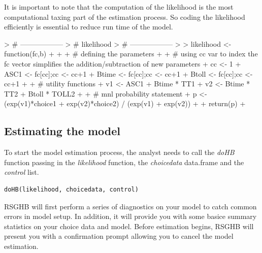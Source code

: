 \documentclass{article}
\begin{document}
It is important to note that the computation of the likelihood is the most computational taxing part of the estimation process. So coding the likelihood efficiently is essential to reduce run time of the model.


\begin{Schunk}
\begin{Sinput}
> # ------------------
> # likelihood
> # ------------------
> 
> likelihood <- function(fc,b)
+ {
+ 
+   # defining the parameters          
+ 
+   # using cc var to index the fc vector simplifies the addition/subtraction of new parameters     
+   cc <- 1
+   ASC1   <- fc[cc];cc <- cc+1
+   Btime  <- fc[cc];cc <- cc+1
+   Btoll  <- fc[cc];cc <- cc+1  
+ 
+   # utility functions
+   v1 <- ASC1       + Btime * TT1                   
+   v2 <-              Btime * TT2 + Btoll * TOLL2   
+  
+   # mnl probability statement
+   p  <- (exp(v1)*choice1 + exp(v2)*choice2) / (exp(v1) + exp(v2))
+ 	
+   return(p)
+ }
\end{Sinput}
\end{Schunk}

\subsection*{Estimating the model}

To start the model estimation process, the analyst needs to call the \emph{doHB} function passing in the \emph{likelihood} function, the \emph{choicedata} data.frame and the \emph{control} list. 

\begin{verbatim}
doHB(likelihood, choicedata, control)
\end{verbatim}

RSGHB will first perform a series of diagnostics on your model to catch common errors in model setup. In addition, it will provide you with some basice summary statistics on your choice data and model. Before estimation begins, RSGHB will present you with a confirmation prompt allowing you to cancel the model estimation.
\end{document}

